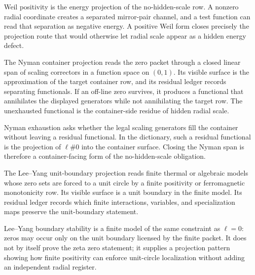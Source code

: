 \begin{principle}
\label{prin:rh-weil-positivity-energy-facing-no-scale-test}
Weil positivity is the energy projection of the no-hidden-scale row. A
nonzero radial coordinate creates a separated mirror-pair channel, and a
test function can read that separation as negative energy. A positive
Weil form closes precisely the projection route that would otherwise let
radial scale appear as a hidden energy defect.
\end{principle}

\begin{definition}
\label{def:rh-nyman-container-projection}
The Nyman container projection reads the zero packet through a closed
linear span of scaling correctors in a function space on $(0,1)$. Its
visible surface is the approximation of the target container row, and
its residual ledger records separating functionals. If an off-line zero
survives, it produces a functional that annihilates the displayed
generators while not annihilating the target row. The unexhausted
functional is the container-side residue of hidden radial scale.
\end{definition}

\begin{principle}
\label{prin:rh-nyman-exhaustion-container-facing-no-scale-test}
Nyman exhaustion asks whether the legal scaling generators fill the
container without leaving a residual functional. In the dictionary, such
a residual functional is the projection of $\ell\#0$ into the container
surface. Closing the Nyman span is therefore a container-facing form of
the no-hidden-scale obligation.
\end{principle}

\begin{definition}
\label{def:rh-lee-yang-unit-boundary-projection}
The Lee--Yang unit-boundary projection reads finite thermal or algebraic
models whose zero sets are forced to a unit circle by a finite positivity
or ferromagnetic monotonicity row. Its visible surface is a unit boundary
in the finite model. Its residual ledger records which finite
interactions, variables, and specialization maps preserve the
unit-boundary statement.
\end{definition}

\begin{principle}
\label{prin:rh-lee-yang-boundary-finite-unit-model}
Lee--Yang boundary stability is a finite model of the same constraint
as $\ell=0$: zeros may occur only on the unit boundary licensed by the
finite packet. It does not by itself prove the zeta zero statement; it
supplies a projection pattern showing how finite positivity can enforce
unit-circle localization without adding an independent radial register.
\end{principle}

